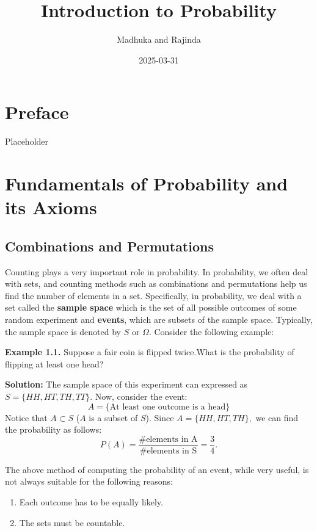 \documentclass[
]{book}
\title{Introduction to Probability}
\author{Madhuka and Rajinda}
\date{2025-03-31}
\begin{document}
\maketitle

{
\setcounter{tocdepth}{2}
\tableofcontents
}
\hypertarget{preface}{%
\chapter*{Preface}\label{preface}}


Placeholder

\hypertarget{fundamentals-of-probability-and-its-axioms}{%
\chapter{Fundamentals of Probability and its Axioms}\label{fundamentals-of-probability-and-its-axioms}}

\hypertarget{combinations-and-permutations}{%
\section{Combinations and Permutations}\label{combinations-and-permutations}}

Counting plays a very important role in probability. In probability, we often deal with sets, and counting methods such as combinations and permutations help us find the number of elements in a set. Specifically, in probability, we deal with a set called the \textbf{sample space} which is the set of all possible outcomes of some random experiment and \textbf{events}, which are subsets of the sample space. Typically, the sample space is denoted by \(S\) or \(\Omega.\) Consider the following example:

\textbf{Example 1.1.}
Suppose a fair coin is flipped twice.What is the probability of flipping at least one head?

\textbf{Solution:}
The sample space of this experiment can expressed as \(S=\{HH,HT,TH,TT\}\). Now, consider the event:
\[A=\{\text{At least one outcome is a head}\}\]
Notice that \(A\subset S\) (\(A\) is a subset of \(S\)). Since \(A=\{HH,HT,TH\},\) we can find the probability as follows:
\[P(A)= \frac{\#\text{elements in A}}{\#\text{elements in S}}=\frac{3}{4}.\]

The above method of computing the probability of an event, while very useful, is not always suitable for the following reasons:

\begin{enumerate}
\def\labelenumi{\arabic{enumi}.}
\item
  Each outcome has to be equally likely.
\item
  The sets must be countable.
\end{enumerate}
\end{document}
